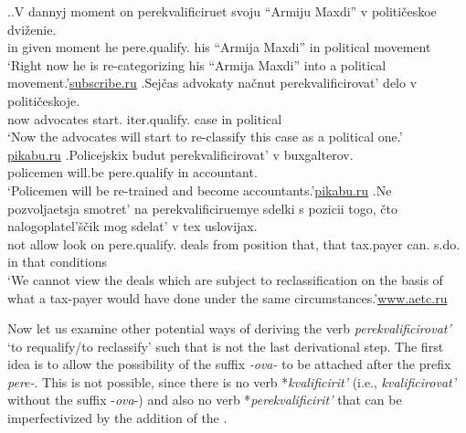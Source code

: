 \ex.\label{ex:qualify}\ag.\label{ex:qualify1}V dannyj moment on perekvalificiruet\textsuperscript{\IPF} svoju {``Armiju Maxdi''} v politi\v{c}eskoe dvi\v{z}enie.\\
in given moment he pere.qualify. his {``Armija Maxdi''} in political movement\\
\trans `Right now he is re-categorizing his ``Armija Maxdi'' into a political movement.'\hbox{}\hfill\hbox{\url{subscribe.ru}}
\bg.\label{ex:qualify2}Sej\v{c}as advokaty na\v{c}nut perekvalificirovat'\textsuperscript{\IPF} delo v politi\v{c}eskoje.\\
now advocates start. iter.qualify. case in political\\
\trans `Now the advocates will start to re-classify this case as a political one.'\\\hbox{}\hfill\hbox{\url{pikabu.ru}}
\bg.\label{ex:qualify3}Policejskix budut perekvalificirovat'\textsuperscript{\IPF} v buxgalterov.\\	
policemen will.be pere.qualify in accountant.\\
\trans `Policemen will be re-trained and become accountants.'\hbox{}\hfill\hbox{\url{pikabu.ru}}
\bg.\label{ex:qualify4}Ne pozvoljaetsja smotret’ na perekvalificiruemye sdelki s pozicii togo, \v{c}to nalogoplatel’\v{s}\v{c}ik mog sdelat’ v tex uslovijax.\\
not allow look on pere.qualify. deals from position that, that tax.payer can. s.do. in that conditions\\
\trans `We cannot view the deals which are subject to reclassification on the basis of what a tax-payer would have done under the same circumstances.'\hbox{}\hfill\hbox{\url{www.aetc.ru}}

Now let us examine other potential ways of deriving the verb \textit{perekvalificirovat'} `to requalify/to reclassify' such that  is not the last derivational step. The first idea is to allow the possibility of the suffix \textit{-ova-} to be attached after the prefix \textit{pere-}. This is not possible, since there is no verb *\textit{kvalificirit'} (i.e., \textit{kvalificirovat'} without the suffix -\textit{ova}-) and also no verb  *\textit{perekvalificirit'} that can be imperfectivized by the addition of the .

